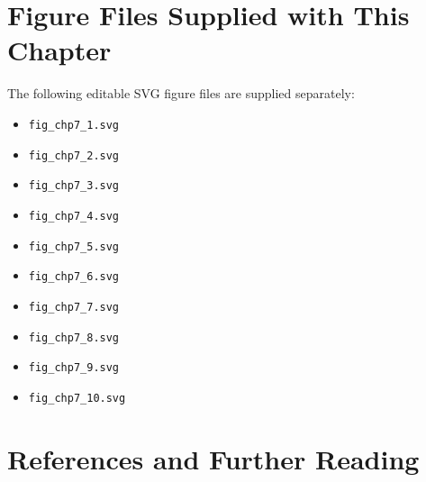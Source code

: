 \documentclass[11pt]{article}
\begin{document}
\section{Figure Files Supplied with This Chapter}

The following editable SVG figure files are supplied separately:
\begin{itemize}[leftmargin=1.4em]
  \item \texttt{fig\_chp7\_1.svg}
  \item \texttt{fig\_chp7\_2.svg}
  \item \texttt{fig\_chp7\_3.svg}
  \item \texttt{fig\_chp7\_4.svg}
  \item \texttt{fig\_chp7\_5.svg}
  \item \texttt{fig\_chp7\_6.svg}
  \item \texttt{fig\_chp7\_7.svg}
  \item \texttt{fig\_chp7\_8.svg}
  \item \texttt{fig\_chp7\_9.svg}
  \item \texttt{fig\_chp7\_10.svg}
\end{itemize}

\section{References and Further Reading}
\end{document}
